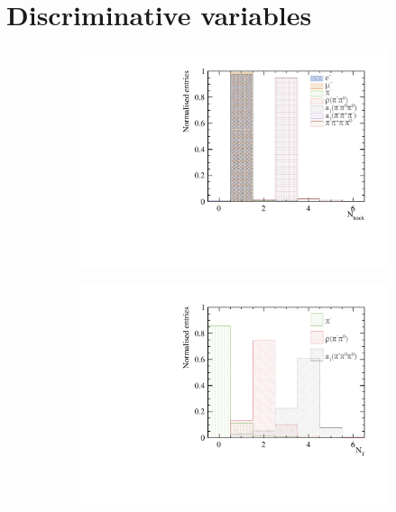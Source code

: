 \section{Discriminative variables}

\begin{figure}[htbp]
\centering
\begin{subfigure}[b]{0.45\textwidth}
 \includegraphics[width=\textwidth]{tau/var2/nCharge_100GeV_improved.pdf}
  \caption{}
  \label{fig:tauVarNCharge}
\end{subfigure}
\begin{subfigure}[b]{0.45\textwidth}
 \includegraphics[width=\textwidth]{tau/var2/nPhoton_100GeV_improved.pdf}

\end{subfigure}
\end{figure}
